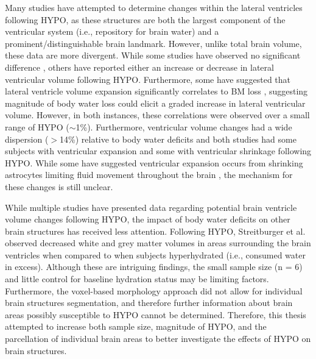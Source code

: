 Many studies have attempted to determine changes within the lateral ventricles following HYPO, as these structures are both the largest component of the ventricular system (i.e., repository for brain water) and a prominent/distinguishable brain landmark. However, unlike total brain volume, these data are more divergent. While some studies have observed no significant difference \cite{meyers_does_2016, dickson_effects_2005, streitburger_investigating_2012,meyers_does_2016,dickson_effects_2005}, others have reported either an increase \cite{kempton_dehydration_2011,kempton_effects_2009} or decrease \cite{watson_effect_2010} in lateral ventricular volume following HYPO. Furthermore, some have suggested that lateral ventricle volume expansion significantly correlates to BM loss \cite{kempton_dehydration_2011, dickson_effects_2005}, suggesting magnitude of body water loss could elicit a graded increase in lateral ventricular volume. However, in both instances, these correlations were observed over a small range of HYPO (${\sim}$1\%). Furthermore, ventricular volume changes had a wide dispersion ($>$14\%) relative to body water deficits and both studies had some subjects with ventricular expansion and some with ventricular shrinkage following HYPO. While some have suggested ventricular expansion occurs from shrinking astrocytes limiting fluid movement throughout the brain \cite{kempton_dehydration_2011}, the mechanism for these changes is still unclear.

While multiple studies have presented data regarding potential brain ventricle volume changes following HYPO, the impact of body water deficits on other brain structures has received less attention. Following HYPO, Streitburger et al. \cite{streitburger_investigating_2012} observed decreased white and grey matter volumes in areas surrounding the brain ventricles when compared to when subjects hyperhydrated (i.e., consumed water in excess). Although these are intriguing findings, the small sample size (n = 6) and little control for baseline hydration status may be limiting factors. Furthermore, the voxel-based morphology approach did not allow for individual brain structures segmentation, and therefore further information about brain areas possibly susceptible to HYPO cannot be determined. Therefore, this thesis attempted to increase both sample size, magnitude of HYPO, and the parcellation of individual brain areas to better investigate the effects of HYPO on brain structures. 

